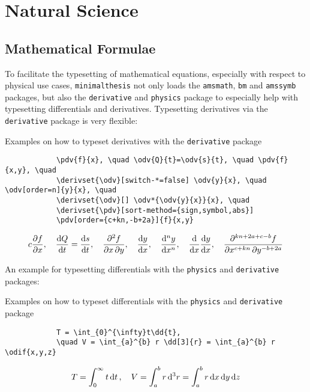 \documentclass{./class/minimalthesis}
\begin{document}
	
	\newpage
	\label{page:example:header-with-chapter}
	\blindtext[4]
	
	\chapter{Natural Science}
	\section{Mathematical Formulae}
	To facilitate the typesetting of mathematical equations, especially with respect to physical use cases, \verb|minimalthesis| not only loads the \verb|amsmath|, \verb|bm| and \verb|amssymb| packages, but also the \verb|derivative| and \verb|physics| package to especially help with typesetting differentials and derivatives.
	\newline Typesetting derivatives via the \verb|derivative| package is very flexible: 
	\begin{table}[h!]
		\centering
		\caption{Examples on how to typeset derivatives with the \texttt{derivative} package}
		\begin{verbatim}
			\pdv{f}{x}, \quad \odv{Q}{t}=\odv{s}{t}, \quad \pdv{f}{x,y}, \quad 
			\derivset{\odv}[switch-*=false] \odv{y}{x}, \quad \odv[order=n]{y}{x}, \quad
			\derivset{\odv}[] \odv*{\odv{y}{x}}{x}, \quad 
			\derivset{\pdv}[sort-method={sign,symbol,abs}] 
			\pdv[order={c+kn,-b+2a}]{f}{x,y}
		\end{verbatim}
		\begin{align*}{c}
			\pdv{f}{x}, \quad \odv{Q}{t}=\odv{s}{t}, \quad \pdv{f}{x,y}, \quad 
			\derivset{\odv}[switch-*=false] \odv{y}{x}, \quad \odv[order=n]{y}{x}, \quad
			\derivset{\odv}[] \odv*{\odv{y}{x}}{x}, \quad 
			\derivset{\pdv}[sort-method={sign,symbol,abs}] \pdv[order={c+kn,-b+2a}]{f}{x,y}
		\end{align*}
	\end{table}
	An example for typesetting differentials with the \verb|physics| and \verb|derivative| packages:
	\begin{table}[h!]
		\centering
		\caption{Examples on how to typeset differentials with the \texttt{physics} and \texttt{derivative} package}
		\begin{verbatim}
			T = \int_{0}^{\infty}t\dd{t}, 
			\quad V = \int_{a}^{b} r \dd[3]{r} = \int_{a}^{b} r \odif{x,y,z}
		\end{verbatim}
		\begin{align*}
			T = \int_{0}^{\infty}t\dd{t}, \quad V = \int_{a}^{b} r \dd[3]{r} = \int_{a}^{b} r \odif{x,y,z}
		\end{align*}
		
	\end{table}
	
\end{document}
